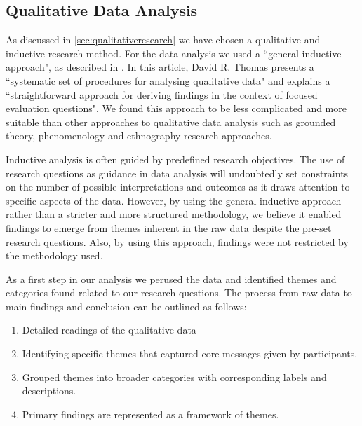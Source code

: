 
\subsection{Qualitative Data Analysis}
\label{sec:qualitativeAnalysis}
As discussed in \ref{sec:qualitativeresearch} we have chosen a qualitative and inductive research method. For the data analysis we used a ``general inductive approach", as described in \cite{thomas2006general}. In this article, David R. Thomas presents a ``systematic set of procedures for analysing qualitative data" and explains a ``straightforward approach for deriving findings in the context of focused evaluation questions". We found this approach to be less complicated and more suitable than other approaches to qualitative data analysis such as grounded theory, phenomenology and ethnography research approaches\cite{thorne2000data}.

Inductive analysis is often guided by predefined research objectives. The use of research questions as guidance in data analysis will undoubtedly set constraints on the number of possible interpretations and outcomes as it draws attention to specific aspects of the data. However, by using the general inductive approach rather than a stricter and more structured methodology, we believe it enabled findings to emerge from themes inherent in the raw data despite the pre-set research questions. Also, by using this approach, findings were not restricted by the methodology used. 

As a first step in our analysis we perused the data and identified themes and categories found related to our research questions. The process from raw data to main findings and conclusion can be outlined as follows:
\begin{enumerate}
\vspace{0,5cm}
\item Detailed readings of the qualitative data
\item Identifying specific themes that captured core messages given by participants.
\item Grouped themes into broader categories with corresponding labels and descriptions.
\item Primary findings are represented as a framework of themes.
\vspace{0,5cm}
\end{enumerate}

